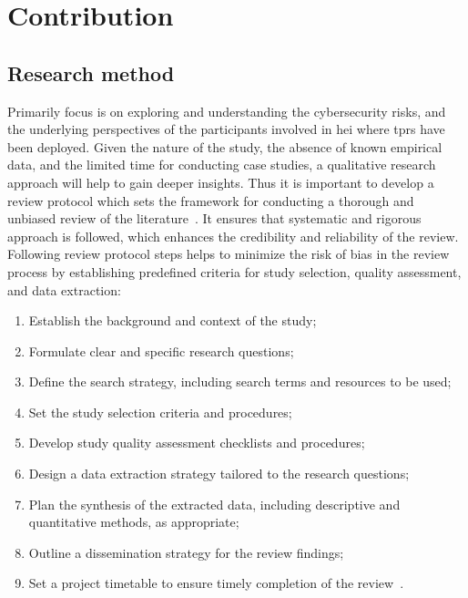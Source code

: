 
\newpage


\section{Contribution}\label{sec:contribution}


\subsection{Research method}\label{subsec:research-method}

Primarily focus is on exploring and understanding the cybersecurity risks, and the underlying perspectives of the participants
involved in \ac{hei} where \ac{tprs} have been deployed. Given
the nature of the study, the absence of known empirical data, and the limited time for conducting case studies, a qualitative research
approach
will help to gain deeper insights. Thus it is important to develop a review protocol which sets the framework for conducting a thorough and
unbiased review of the literature~\cite[8]{systematic_review_2004}. It ensures that
systematic and rigorous approach is followed, which enhances the credibility and reliability of the review. Following review protocol steps
helps
to minimize the risk of bias in the review process by establishing predefined criteria for study selection, quality assessment, and data
extraction:

\begin{enumerate}
  \item Establish the background and context of the study;
  \item Formulate clear and specific research questions;
  \item Define the search strategy, including search terms and resources to be used;
  \item Set the study selection criteria and procedures;
  \item Develop study quality assessment checklists and procedures;
  \item Design a data extraction strategy tailored to the research questions;
  \item Plan the synthesis of the extracted data, including descriptive and quantitative methods, as appropriate;
  \item Outline a dissemination strategy for the review findings;
  \item Set a project timetable to ensure timely completion of the review~\cite[4-5]{systematic_review_2004}.
\end{enumerate}

